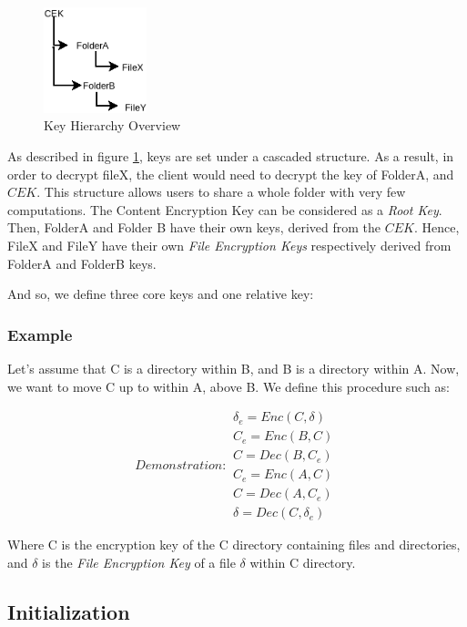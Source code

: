 \documentclass[a4paper,9pt,twoside]{article}
\begin{document}
\begin{figure}[H]
\centering
\includegraphics[width=30mm]{./diagram/key_hierarchy.png}
\caption{Key Hierarchy Overview \label{keyhierarchy}}
\end{figure}

    As described in figure \ref{keyhierarchy}, keys are set under a cascaded structure. As a result, 
in order to decrypt fileX, the client would need to decrypt the key of FolderA, 
and $CEK$. This structure allows users to share a whole folder with very few computations.
    The Content Encryption Key can be considered as a \emph{Root Key}. Then, FolderA and Folder B 
have their own keys, derived from the $CEK$. Hence, FileX and FileY have 
their own \emph{File Encryption Keys} respectively derived from FolderA and FolderB keys.

And so, we define three core keys and one relative key:

\subsubsection{Example}
Let's assume that C is a directory within B, and B is a directory within A. Now, we want to move C up to within A, above B. 
We define this procedure such as:

\begin{subequations}
Demonstration:
\begin{align}
    \delta_e=Enc(C, \delta) \\
    C_e=Enc(B, C) \\
    C=Dec(B, C_e) \\
    C_e=Enc(A,C) \\
    C=Dec(A,C_e) \\
    \delta=Dec(C, \delta_e)
\end{align}
\end{subequations}


Where C is the encryption key of the C directory containing files and directories, and 
$\delta$ is the \emph{File Encryption Key} of a file $\delta$ within C directory.

\subsection{Initialization}
\end{document}
